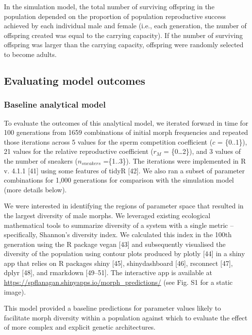 \documentclass[
  11pt,
  a4paper,
]{article}
\begin{document}
In the simulation model, the total number of surviving offspring in the
population depended on the proportion of population reproductive success
achieved by each individual male and female (i.e., each generation, the
number of offspring created was equal to the carrying capacity). If the
number of surviving offspring was larger than the carrying capacity,
offspring were randomly selected to become adults.

\hypertarget{evaluating-model-outcomes}{%
\subsection{Evaluating model outcomes}\label{evaluating-model-outcomes}}

\hypertarget{baseline-analytical-model}{%
\subsubsection{Baseline analytical model}\label{baseline-analytical-model}}

To evaluate the outcomes of this analytical model, we iterated forward
in time for 100 generations from 1659 combinations of initial morph
frequencies and repeated those iterations across 5 values for the sperm
competition coefficient (\(c\) = \{0..1\}), 21 values for the relative
reproductive coefficient (\(r_M\) = \{0\ldots2\}), and 3 values of the number
of sneakers (\(n_{sneakers}\) =\{1..3\}). The iterations were implemented in
R v. 4.1.1 {[}41{]} using some
features of tidyR {[}42{]}. We also ran a subset of
parameter combinations for 1,000 generations for comparison with the
simulation model (more details below).

We were interested in identifying the regions of parameter space that
resulted in the largest diversity of male morphs. We leveraged existing
ecological mathematical tools to summarize diversity of a system with a
single metric -- specifically, Shannon's diversity index. We calculated
this index in the 100th generation using the R package vegan
{[}43{]} and subsequently visualised the
diversity of the population using contour plots produced by plotly
{[}44{]} in a shiny app that relies on R
packages shiny {[}45{]}, shinydashboard
{[}46{]}, rsconnect
{[}47{]}, dplyr
{[}48{]}, and rmarkdown
{[}49--51{]}. The interactive app is available at
\url{https://spflanagan.shinyapps.io/morph_predictions/} (see Fig. S1 for a
static image).

This model provided a baseline predictions for parameter values likely
to facilitate morph diversity within a population against which to
evaluate the effect of more complex and explicit genetic architectures.
\end{document}
